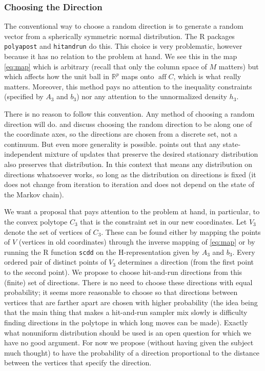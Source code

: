 \documentclass[11pt]{article}
\DeclareMathOperator{\aff}{aff}
\newcommand{\real}{\mathbb{R}}
\begin{document}
\subsubsection{Choosing the Direction}

The conventional way to choose a random direction is to generate
a random vector from a spherically symmetric normal distribution.
The R packages \texttt{polyapost} and \texttt{hitandrun} do this.
This choice is very problematic, however because it has no relation
to the problem at hand.  We see this in the map \eqref{eq:map} which
is arbitrary (recall that only the column space of $M$ matters) but
which affects how the unit ball in $\real^p$ maps onto $\aff C$,
which is what really matters.  Moreover, this method pays no attention
to the inequality constraints (specified by $A_3$ and $b_3$) nor any
attention to the unnormalized density $h_3$.

There is no reason to follow this convention.  Any method of choosing
a random direction will do.  \citet{smith} and \citet{hit-run-one}
discuss choosing the random direction to be along one of the coordinate axes,
so the directions are chosen from a discrete set, not a continuum.
But even more generality is possible.
\citet[Section~1.12.8]{geyer-intro} points out
that any state-independent mixture of updates that preserve the desired
stationary distribution also preserves that distribution.  In this context
that means any distribution on directions whatsoever works, so long as the
distribution on directions is fixed (it does not change from iteration
to iteration and does not depend on the state of the Markov chain).

We want a proposal that pays attention to the problem at hand, in particular,
to the convex polytope $C_3$ that is the constraint set in our new coordinates.
Let $V_3$ denote the set of vertices of $C_3$.  These can be found either
by mapping the points of $V$ (vertices in old coordinates) through the
inverse mapping of \eqref{eq:map} or by running the R function \texttt{scdd}
on the H-representation given by $A_3$ and $b_3$.  Every ordered pair of
distinct points of $V_3$ determines a direction (from the first point to the
second point).  We propose to choose hit-and-run directions from this
(finite) set of directions.  There is no need to choose these directions
with equal probability; it seems more reasonable to choose so that directions
between vertices that are farther apart are chosen with higher probability
(the idea being that the main thing that makes a hit-and-run sampler mix
slowly is difficulty finding directions in the polytope in which long moves
can be made).  Exactly what nonuniform distribution should be used is an
open question for which we have no good argument.  For now we propose
(without having given the subject much thought) to have the probability
of a direction proportional to the distance between the vertices that
specify the direction.
\end{document}
